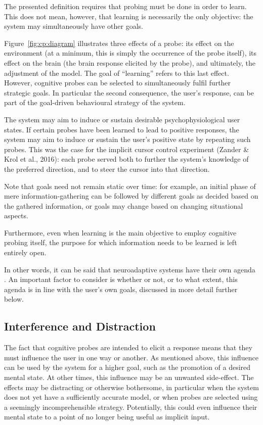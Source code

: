 The presented definition requires that probing must be done in order to learn. This does not mean, however, that learning is necessarily the only objective: the system may simultaneously have other goals.

Figure~\ref{fig:cp:diagram} illustrates three effects of a probe: its effect on the environment (at a minimum, this is simply the occurrence of the probe itself), its effect on the brain (the brain response elicited by the probe), and ultimately, the adjustment of the model. The goal of ``learning'' refers to this last effect. However, cognitive probes can be selected to simultaneously fulfil further strategic goals. In particular the second consequence, the user's response, can be part of the goal-driven behavioural strategy of the system.

The system may aim to induce or sustain desirable psychophysiological user states. If certain probes have been learned to lead to positive responses, the system may aim to induce or sustain the user's positive state by repeating such probes. This was the case for the implicit cursor control experiment (Zander \& Krol et al., 2016): each probe served both to further the system's knowledge of the preferred direction, and to steer the cursor into that direction.

Note that goals need not remain static over time: for example, an initial phase of mere information-gathering can be followed by different goals as decided based on the gathered information, or goals may change based on changing situational aspects.

Furthermore, even when learning is the main objective to employ cognitive probing itself, the purpose for which information needs to be learned is left entirely open.

In other words, it can be said that neuroadaptive systems have their own agenda \cite{fairclough2017intadapt}. An important factor to consider is whether or not, or to what extent, this agenda is in line with the user's own goals, discussed in more detail further below.


\subsection{Interference and Distraction}
\label{sec:interference}

The fact that cognitive probes are intended to elicit a response means that they must influence the user in one way or another. As mentioned above, this influence can be used by the system for a higher goal, such as the promotion of a desired mental state. At other times, this influence may be an unwanted side-effect. The effects may be distracting or otherwise bothersome, in particular when the system does not yet have a sufficiently accurate model, or when probes are selected using a seemingly incomprehensible strategy. Potentially, this could even influence their mental state to a point of no longer being useful as implicit input.

